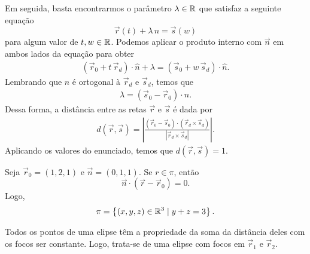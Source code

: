 \begin{questions}
\begin{solution}
    Em seguida, basta encontrarmos o parâmetro $\lambda\in{\mathbb R}$ que satisfaz a seguinte equação
    \begin{equation*}
        \vec r(t) + \lambda \, \hat n = \vec s(w)
    \end{equation*}
    para algum valor de $t,w\in{\mathbb R}$.
    Podemos aplicar o produto interno com $\vec n$ em ambos lados da equação para obter
    \vspace{-3mm}
    \begin{align*}
        (\vec r_0 + t\,\vec r_d) \cdot \hat n + \lambda = (\vec s_0 + w\,\vec s_d)\cdot \hat n.
    \end{align*}
    Lembrando que $\hat n$ é ortogonal à $\vec r_d$ e $\vec s_d$, temos que
    \begin{align*}
        \lambda = (\vec s_0 - \vec r_0) \cdot \hat n.
    \end{align*}
    Dessa forma, a distância entre as retas $\vec r$ e $\vec s$ é dada por \vspace{-2mm}
    \begin{align*}
        \boxed{d(\vec r,\vec s) = \left| \frac{(\vec r_0 - \vec s_0) \cdot (\vec r_d \times \vec s_d)}{|\vec r_d \times \vec s_d|} \right|}.
    \end{align*}
    Aplicando os valores do enunciado, temos que $d(\vec r,\vec s) = 1$.
\end{solution}

\setcounter{question}{5}
\begin{solution}
    Seja $\vec r_0 = (1,2,1)$ e $\vec n = (0,1,1)$. Se $r\in\pi$, então \vspace{-2mm}
    \[\vec n \cdot (\vec r - \vec r_0) = 0.\]
    Logo, \vspace{-3mm}
    \[\pi = \left\{(x,y,z)\in{\mathbb R}^3 \mid y + z = 3 \right\}.\]
\end{solution}


\setcounter{question}{7}

\begin{solution}
    Todos os pontos de uma elipse têm a propriedade da soma da distância deles com os focos ser constante. Logo, trata-se de uma elipse com focos em $\vec r_1$ e $\vec r_2$.
\end{solution}


\end{questions}
